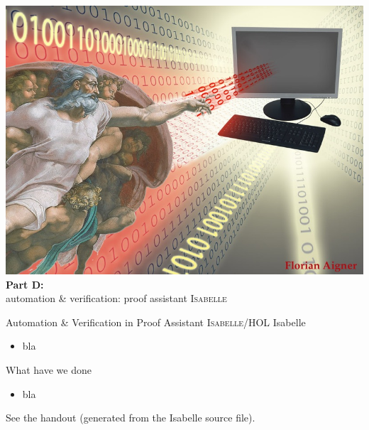 
\begin{frame}{} \Large \centering
\includegraphics[width=.7\textwidth]{TUWien-GodComputerC} 
\vfill
\textbf{Part D:} \\
\quad automation \& verification: proof assistant \textsc{Isabelle} \\[2em]
\end{frame}



\begin{frame}{Automation \& Verification in Proof Assistant \textsc{Isabelle/HOL}} \Large
Isabelle
\begin{itemize}
\item bla
\end{itemize}
\vfill
What have we done
\begin{itemize}
\item bla 
\end{itemize}
\vfill
See the handout (generated from the Isabelle source file).
\end{frame}